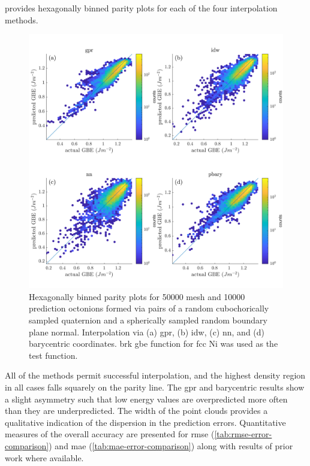 \documentclass[preprint,12pt]{elsarticle}
\begin{document}
 provides hexagonally binned parity plots \cite{beanHexscatter2020} for each of the four interpolation methods.
\begin{figure}
    \centering
    \includegraphics[scale=1]{brkparity50000.png}
    \caption{Hexagonally binned parity plots for \num{50000} mesh and \num{10000} prediction octonions formed via pairs of a random cubochorically sampled quaternion and a spherically sampled random boundary plane normal. Interpolation via (a) \acrlong{gpr}, (b) \acrlong{idw}, (c) \acrlong{nn}, and (d) barycentric coordinates.  \acrlong{brk} \acrlong{gbe} function for \gls{fcc} Ni was used as the test function.}
    \label{fig:brkparity50000}
\end{figure}

All of the methods permit successful interpolation, and the highest density region in all cases falls squarely on the parity line. The \Gls{gpr} and barycentric results show a slight asymmetry such that low energy values are overpredicted more often than they are underpredicted. The width of the point clouds provides a qualitative indication of the dispersion in the prediction errors. Quantitative measures of the overall accuracy are presented for \gls{rmse} (\cref{tab:rmse-error-comparison}) and \gls{mae} (\cref{tab:mae-error-comparison}) along with results of prior work where available.
\end{document}
